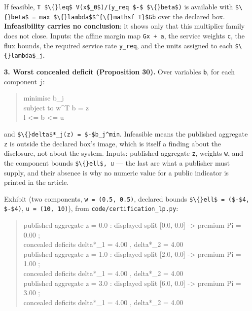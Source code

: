 \documentclass[11pt]{article}
\begin{document}
If feasible, \texttt{T \$\textbackslash\{\}leq\$ V(x\$\_0\$)/(y\_req \$-\$ \$\textbackslash\{\}beta\$)} is available with \texttt{\$\textbackslash\{\}beta\$ = max \$\textbackslash\{\}lambda\$\$\textasciicircum{}\{\textbackslash\{\}mathsf T\}\$Gb} over the declared box. \textbf{Infeasibility carries no conclusion}: it shows only that this multiplier family does not close. Inputs: the affine margin map \texttt{Gx + a}, the service weights \texttt{c}, the flux bounds, the required service rate \texttt{y\_req}, and the units assigned to each \texttt{\$\textbackslash\{\}lambda\$\_j}.

\textbf{3. Worst concealed deficit (Proposition 30).} Over variables \texttt{b}, for each component \texttt{j}:

\begin{quote}\ttfamily\footnotesize\raggedright\setlength{\parskip}{0pt}
minimise   b\_j\\
subject to w\textasciicircum{}T b = z\\
           l <= b <= u
\end{quote}

and \texttt{\$\textbackslash\{\}delta\$*\_j(z) = \$-\$b\_j\textasciicircum{}min}. Infeasible means the published aggregate \texttt{z} is outside the declared box's image, which is itself a finding about the disclosure, not about the system. Inputs: published aggregate \texttt{z}, weights \texttt{w}, and the component bounds \texttt{\$\textbackslash\{\}ell\$, u} --- the last are what a publisher must supply, and their absence is why no numeric value for a public indicator is printed in the article.

Exhibit (two components, \texttt{w = (0.5, 0.5)}, declared bounds \texttt{\$\textbackslash\{\}ell\$ = (\$-\$4, \$-\$4)}, \texttt{u = (10, 10)}), from \texttt{code/certification\_lp.py}:

\begin{quote}\ttfamily\footnotesize\raggedright\setlength{\parskip}{0pt}
published aggregate z =  0.0 :  displayed split [0.0, 0.0] -> premium Pi =  0.00 ;\\
                                 concealed deficits delta*\_1 = 4.00 , delta*\_2 = 4.00\\
published aggregate z =  1.0 :  displayed split [2.0, 0.0] -> premium Pi =  1.00 ;\\
                                 concealed deficits delta*\_1 = 4.00 , delta*\_2 = 4.00\\
published aggregate z =  3.0 :  displayed split [6.0, 0.0] -> premium Pi =  3.00 ;\\
                                 concealed deficits delta*\_1 = 4.00 , delta*\_2 = 4.00
\end{quote}
\end{document}
